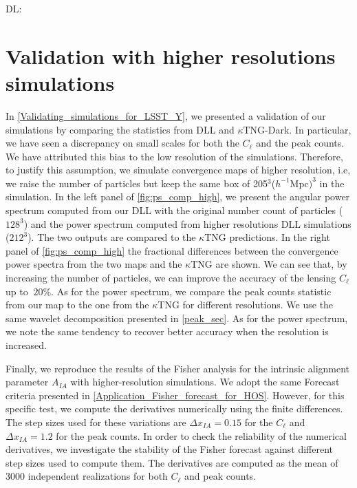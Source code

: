 \documentclass[twocolumn,twocolappendix]{aastex63}
\newcommand{\denise}[1]{{\color{red}DL: #1}}
\begin{document}
\denise{
\section{Validation with higher resolutions simulations}
In \autoref{Validating_simulations_for_LSST_Y}, we presented a validation of our simulations by comparing the statistics from DLL and $\kappa$TNG-Dark.
In particular, we have seen a discrepancy on small scales for both the $C_{\ell}$ and the peak counts. We have attributed this bias to the low resolution of the simulations. Therefore, to justify this assumption, we simulate convergence maps of higher resolution, i.e, we raise the number of particles but keep the same box of 205$^3$($h^{-1}$Mpc$)^3$ in the simulation. In the left panel of  \autoref{fig:ps_comp_high}, we present the angular power spectrum computed from our DLL with the original number count of particles ($128^3$) and the power spectrum computed from higher resolutions DLL simulations ($212^3$). The two outputs are compared to the $\kappa$TNG predictions. In the right panel  of \autoref{fig:ps_comp_high} the fractional differences between the convergence power spectra from the two maps and the $\kappa$TNG are shown. We can see that, by increasing the number of particles, we can improve the accuracy of the lensing $C_{\ell}$ up to $~20\%$.
As for the power spectrum, we compare the peak counts statistic from our map to the one from the $\kappa$TNG for different resolutions. We use the same wavelet decomposition presented in \autoref{peak_sec}. As for the power spectrum, we note the same tendency to recover better accuracy when the resolution is increased. 

Finally, we reproduce the results of the Fisher analysis for the intrinsic alignment parameter $A_{IA}$ with higher-resolution simulations. We adopt the same Forecast criteria presented in \autoref{Application_Fisher_forecast_for_HOS}. However, for this specific test, we compute the derivatives numerically using the finite differences. The step sizes used for these variations are $\Delta x_{IA}=0.15$ for the $C_{\ell}$ and $\Delta x_{IA}=1.2$ for the peak counts. 
In order to check the reliability of the numerical derivatives, we investigate the stability of the Fisher forecast against different step sizes used to compute them.
The derivatives are computed as the mean of 3000 independent realizations for both $C_{\ell}$ and peak counts. 

}
\end{document}
